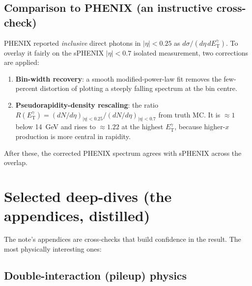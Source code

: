 \documentclass[11pt]{article}
\newcommand{\ETg}{E_{\mathrm{T}}^{\gamma}}
\begin{document}
\subsection{Comparison to PHENIX (an instructive cross-check)}

PHENIX reported \emph{inclusive} direct photons in $|\eta|<0.25$ as $d\sigma/(d\eta\,d\ETg)$. To
overlay it fairly on the sPHENIX $|\eta|<0.7$ isolated measurement, two corrections are applied:
\begin{enumerate}[leftmargin=1.6em]
  \item \textbf{Bin-width recovery}: a smooth modified-power-law fit removes the few-percent
  distortion of plotting a steeply falling spectrum at the bin centre.
  \item \textbf{Pseudorapidity-density rescaling}: the ratio
  $R(\ETg)=(dN/d\eta)_{|\eta|<0.25}/(dN/d\eta)_{|\eta|<0.7}$ from truth MC. It is $\approx1$
  below 14~GeV and rises to $\approx1.22$ at the highest $\ETg$, because higher-$x$ production
  is more central in rapidity.
\end{enumerate}
After these, the corrected PHENIX spectrum agrees with sPHENIX across the overlap.

\section{Selected deep-dives (the appendices, distilled)}

The note's appendices are cross-checks that build confidence in the result. The most physically
interesting ones:

\subsection{Double-interaction (pileup) physics}
\label{sec:pileup}
\end{document}
